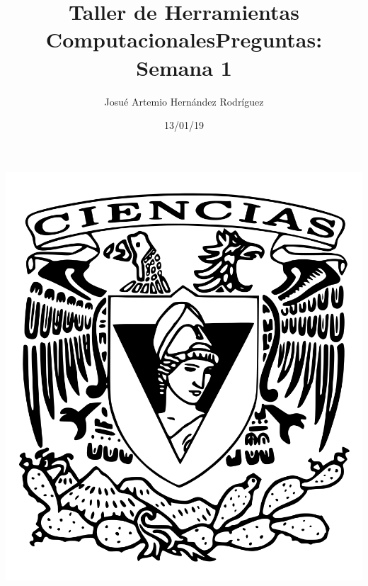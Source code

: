 \documentclass[letterpaper, 12pt, oneside]{article}%
\title{\Huge Taller de Herramientas Computacionales}
\author{Josué Artemio Hernández Rodríguez}%
\date{13/01/19}%
\begin{document}
\maketitle
\begin{center}%
\includegraphics[scale=0.2]{2.png}%
\end{center}%
\newpage%

\title{\huge Preguntas: Semana 1\\}%
\end{document}
